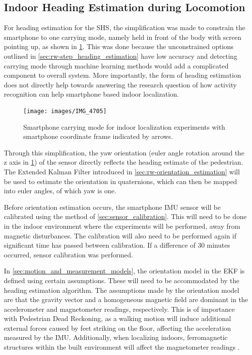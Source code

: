 \newpage
\subsection{Indoor Heading Estimation during Locomotion}

For heading estimation for the \ac{SHS}, the simplification was made to constrain the smartphone to one carrying mode, namely held in front of the body with screen pointing up, as shown in \cref{fig:experiment_carrying_position}. This was done because the unconstrained options outlined in \cref{sec:rw-step_heading_estimation} have low accuracy and detecting carrying mode through machine learning methods would add a complicated component to overall system. More importantly, the form of heading estimation does not directly help towards answering the research question of how activity recognition can help smartphone based indoor localization.\par 
\begin{figure}[H]
	\centering
	\texttt{[image: images/IMG\_4705]}
	\caption{Smartphone carrying mode for indoor localization experiments with smartphone coordinate frame indicated by arrows.}
	\label{fig:experiment_carrying_position}
\end{figure}
Through this simplification, the yaw orientation (euler angle rotation around the z axis in \cref{fig:experiment_carrying_position}) of the sensor directly reflects the heading estimate of the pedestrian. The Extended Kalman Filter introduced in \cref{sec:rw-orientation_estimation} will be used to estimate the orientation in quaternions, which can then be mapped into euler angles, of which yaw is one. \par 

Before orientation estimation occurs, the smartphone \ac{IMU} sensor will be calibrated using the method of \cref{sec:sensor_calibration}. This will need to be done in the indoor environment where the experiments will be performed, away from magnetic disturbances. The calibration will also need to be performed again if significant time has passed between calibration. If a difference of 30 minutes occurred, sensor calibration was performed.\par 

In \cref{sec:motion_and_measurement_models}, the orientation model in the EKF is defined using certain assumptions. These will need to be accommodated by the heading estimation algorithm.
The assumptions made by the orientation model  are that the gravity vector and a homogeneous magnetic field are dominant in the accelerometer and magnetometer readings, respectively. This is of importance with Pedestrian Dead Reckoning, as a walking motion will induce additional external forces caused by feet striking on the floor, affecting the acceleration measured by the IMU. Additionally, when localizing indoors, ferromagnetic structures within the built environment will affect the magnetometer readings \cite{Michel2015a}.\par 

